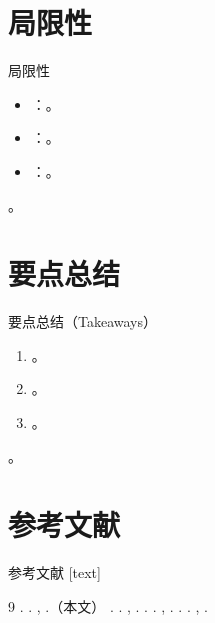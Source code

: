 {%
\renewcommand{\secblurb}{\ph{本节一句话主旨：主要局限与未来方向}}
\section{局限性}

\begin{frame}{局限性}
  \begin{itemize}
    \item {}：。
    \item {}：。
    \item {}：。
  \end{itemize}
  \begin{callout}[作者展望]
    。
  \end{callout}
\end{frame}

\renewcommand{\secblurb}{\ph{本节一句话主旨：全文最值得带走的结论}}
\section{要点总结}

\begin{frame}{要点总结（Takeaways）}
  \begin{enumerate}
    \item {}。
    \item {}。
    \item {}。
  \end{enumerate}
  \begin{callout}[一句话带走]
    。
  \end{callout}
\end{frame}

\renewcommand{\secblurb}{\ph{本节一句话主旨：关键参考与根基工作}}
\section{参考文献}

\begin{frame}{参考文献}
  [text]
  \footnotesize
  \begin{thebibliography}{9}
     . \textit{}. , .（本文）
     . \textit{}. , .
     . \textit{}. , .
     . \textit{}. , .
  \end{thebibliography}
\end{frame}

}
